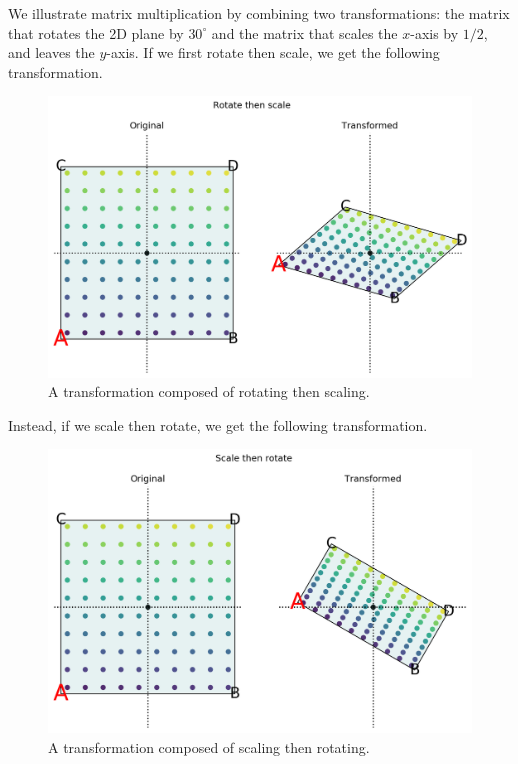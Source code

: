 \documentclass[a4paper, openany]{memoir}
\begin{document}
    We illustrate matrix multiplication by combining two transformations: the matrix that rotates the 2D plane by $30^{\circ}$ and the matrix that scales the $x$-axis by $1/2$, and leaves the $y$-axis. If we first rotate then scale, we get the following transformation.
    \begin{figure}[H]
        \centering
        \includegraphics[scale=0.4]{src/3.18 RotateScale.png}
        \caption{A transformation composed of rotating then scaling.}
    \end{figure}    
    \noindent Instead, if we scale then rotate, we get the following transformation.
    \begin{figure}[H]
        \centering
        \includegraphics[scale=0.4]{src/3.19 ScaleRotate.png}
        \caption{A transformation composed of scaling then rotating.}
    \end{figure}
\end{document}
